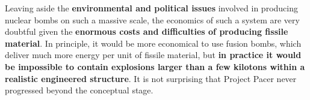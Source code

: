 {Leaving aside the \textbf{environmental and political
issues} involved in producing nuclear bombs on such a massive scale, the economics of such a system are very doubtful given the \textbf{enormous costs and difficulties of producing fissile material}. In principle, it would be more economical to use fusion bombs, which deliver much more energy per unit of fissile material, but \textbf{in practice it would be impossible to contain explosions larger than a few kilotons within a realistic engineered structure}. It is not surprising that
Project Pacer never progressed beyond the conceptual stage.
}
